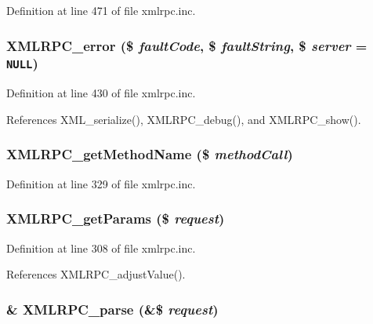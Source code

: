 Definition at line 471 of file xmlrpc.inc.\hypertarget{xmlrpc_8inc_0cdc54b1376ccbbe412175c9819a95ac}{
\subsubsection{\setlength{\rightskip}{0pt plus 5cm}XMLRPC\_\-error (\$ {\em faultCode}, \$ {\em faultString}, \$ {\em server} = {\tt NULL})}}
\label{xmlrpc_8inc_0cdc54b1376ccbbe412175c9819a95ac}




Definition at line 430 of file xmlrpc.inc.

References XML\_\-serialize(), XMLRPC\_\-debug(), and XMLRPC\_\-show().\hypertarget{xmlrpc_8inc_70efa062e92a380196ed8053850c0906}{
\subsubsection{\setlength{\rightskip}{0pt plus 5cm}XMLRPC\_\-getMethodName (\$ {\em methodCall})}}
\label{xmlrpc_8inc_70efa062e92a380196ed8053850c0906}




Definition at line 329 of file xmlrpc.inc.\hypertarget{xmlrpc_8inc_ce4ea8e1274ca2ee3f51ec5a724f00f3}{
\subsubsection{\setlength{\rightskip}{0pt plus 5cm}XMLRPC\_\-getParams (\$ {\em request})}}
\label{xmlrpc_8inc_ce4ea8e1274ca2ee3f51ec5a724f00f3}




Definition at line 308 of file xmlrpc.inc.

References XMLRPC\_\-adjustValue().\hypertarget{xmlrpc_8inc_708b2136ca600664d2207a511b3cf3f8}{
\subsubsection{\setlength{\rightskip}{0pt plus 5cm}\& XMLRPC\_\-parse (\&\$ {\em request})}}
\label{xmlrpc_8inc_708b2136ca600664d2207a511b3cf3f8}





